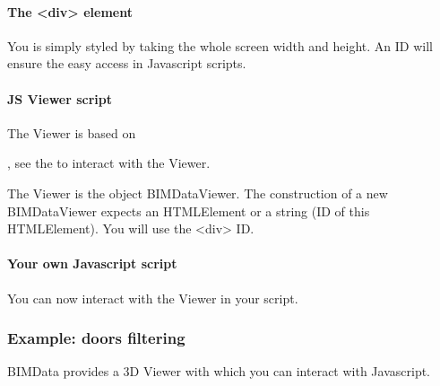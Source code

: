 \documentclass[a4paper,12pt,english]{sphinxmanual}
\begin{document}
\paragraph{The \textless{}div\textgreater{} element}
\label{\detokenize{viewer/include_viewer:the-div-element}}
You  is simply styled by taking the whole screen width and height.
An ID will ensure the easy access in Javascript scripts.
\begin{quote}

%
\begin{sphinxVerbatim}[commandchars=\\\{\}]
   
\end{sphinxVerbatim}
\end{quote}


\paragraph{JS Viewer script}
\label{\detokenize{viewer/include_viewer:js-viewer-script}}
The Viewer is based on %
\begin{footnote}[15]\sphinxAtStartFootnote
{}
%
\end{footnote}, see the {\hyperref[\detokenize{viewer/parameters::doc}]{}} to interact with the Viewer.

The Viewer is the object BIMDataViewer. The construction of a new BIMDataViewer expects an HTMLElement or a string (ID of this HTMLElement).
You will use the \textless{}div\textgreater{} ID.


\paragraph{Your own Javascript script}
\label{\detokenize{viewer/include_viewer:your-own-javascript-script}}
You can now interact with the Viewer in your script.


\subsubsection{Example: doors filtering}
\label{\detokenize{viewer/example_doors:example-doors-filtering}}\label{\detokenize{viewer/example_doors::doc}}
BIMData provides a 3D Viewer with which you can interact with Javascript.
\end{document}
